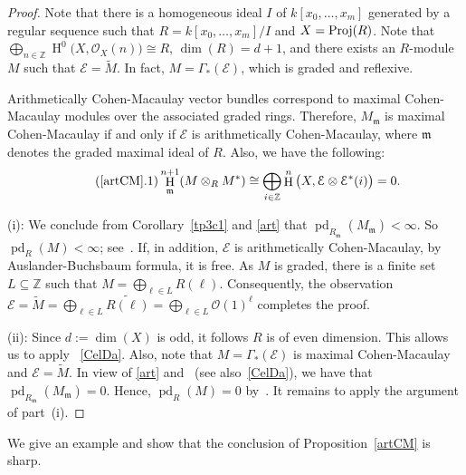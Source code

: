 \documentclass[11pt]{amsart}
\theoremstyle{definition}
\theoremstyle{definition}
\numberwithin{equation}{section}
\newcommand{\fm}{\mathfrak{m}}
\DeclareMathOperator{\hh}{H}
\DeclareMathOperator{\pd}{pd}
\begin{document}
\begin{proof} Note that there is a homogeneous ideal $I$ of $k[x_0,\ldots, x_m]$ generated by a regular sequence such that $R=k[x_0, \ldots, x_m]/I$ and $X= \textmd{Proj}(R)$. Note that $\bigoplus_{n\in \mathbb{Z}} \hh^0\big(X,\mathcal{O}_X(n)\big) \cong R$, $\dim(R)=d+1$, and there exists an $R$-module $M$ such that $\mathcal{E} =\widetilde{M}$. In fact, $M=\Gamma_\ast(\mathcal{E})$, which is graded and reflexive. 

Arithmetically Cohen-Macaulay vector bundles correspond to maximal Cohen-Macaulay modules over the associated graded rings. Therefore, $M_{\fm}$ is maximal Cohen-Macaulay if and only if $\mathcal{E}$ is arithmetically Cohen-Macaulay, where $\fm$ denotes the graded maximal ideal of $R$.
Also, we have the following:
\begin{equation}\label{art} \tag{\ref*{artCM}.1}
\hh^{n+1}_{\fm}(M\otimes_RM^*)\cong\bigoplus_{i\in\mathbb{Z}}\hh^n \big(X,\mathcal{\mathcal{E}}\otimes \mathcal{\mathcal{\mathcal{E}}}^\ast(i)\big)=0.
\end{equation}

(i): We conclude from Corollary~\ref{tp3c1} and \eqref{art} that $\pd_{R_{\fm}}(M_{\fm})<\infty$. So $\pd_R(M)<\infty$; see~\cite[1.5.15(e)]{BH}. 
 If, in addition, $\mathcal{E}$ is arithmetically Cohen-Macaulay,
 by Auslander-Buchsbaum formula, it is free. As $M$ is graded, there is a finite set $L\subseteq \mathbb{Z}$ such that $M=\bigoplus_{ \ell\in L}R(\ell)$. Consequently, the observation $\mathcal{E} =\widetilde{M}=\bigoplus_{ \ell\in L}\widetilde{R(\ell)}=\bigoplus_{ \ell\in L}\mathcal{O}(1)^{\ell}$ completes the proof.

(ii): Since $d:=\dim(X)$ is odd, it follows $R$ is of even dimension.  This allows us to apply ~\ref{CelDa}. Also, note that $M=\Gamma_\ast(\mathcal{E})$ is maximal Cohen-Macaulay and $\mathcal{E} =\widetilde{M}$. In view of \eqref{art} and~\cite[3.9]{CeD} (see also~\ref{CelDa}), we have that $\pd_{R_{\fm}}(M_{\fm})=0$. Hence, $\pd_R(M)=0$ by~\cite[1.5.15(e)]{BH}. It remains to apply the argument of part~(i).
\end{proof}

We give an example and show that the conclusion of Proposition~\ref{artCM} is sharp.
\end{document}
